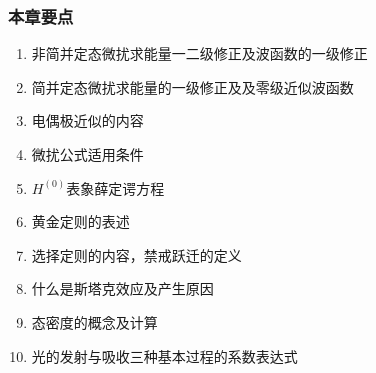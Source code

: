 \begin{frame} 
  \frametitle{本章要点}
 \begin{enumerate}
  \item 非简并定态微扰求能量一二级修正及波函数的一级修正
  \item 简并定态微扰求能量的一级修正及及零级近似波函数
  \item 电偶极近似的内容
  \item 微扰公式适用条件
  \item $H^{(0)}$表象薛定谔方程
  \item 黄金定则的表述
  \item 选择定则的内容，禁戒跃迁的定义
  \item 什么是斯塔克效应及产生原因
  \item 态密度的概念及计算
  \item 光的发射与吸收三种基本过程的系数表达式
 \end{enumerate}
\end{frame} 